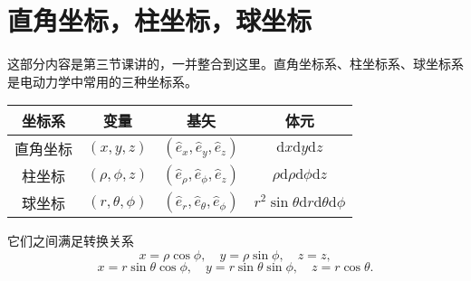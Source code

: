 \documentclass[UTF8]{ctexbook}
\renewcommand{\d}{\mathrm{d}}
\numberwithin{equation}{chapter}
\begin{document}
	\section{直角坐标，柱坐标，球坐标}
	这部分内容是第三节课讲的，一并整合到这里。直角坐标系、柱坐标系、球坐标系是电动力学中常用的三种坐标系。
	\begin{table}[H]
		\centering
		\begin{tabular}{|c|c|c|c|}
			\hline
			坐标系 & 变量 & 基矢 & 体元 \\ \hline
			直角坐标 & $(x,y,z)$ & $(\hat{e}_x,\hat{e}_y,\hat{e}_z)$ & $\d x\d y \d z$ \\ \hline
			柱坐标 & $(\rho,\phi,z)$ & $(\hat{e}_\rho,\hat{e}_\phi,\hat{e}_z)$ & $\rho\d \rho\d \phi\d z$ \\ \hline
			球坐标 & $(r,\theta,\phi)$ & $(\hat{e}_r,\hat{e}_\theta,\hat{e}_\phi)$ & $r^2\sin\theta\d r\d\theta\d\phi$ \\ \hline
		\end{tabular}
	\end{table}
	它们之间满足转换关系
	\[x=\rho\cos\phi,\quad y=\rho\sin\phi,\quad z=z,\]
	\[x=r\sin\theta\cos\phi,\quad y=r\sin\theta\sin\phi,\quad z=r\cos\theta.\]
	
\end{document}
